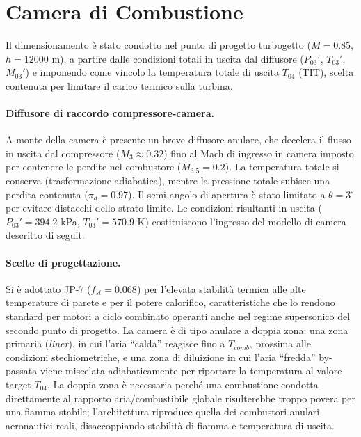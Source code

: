 \section{Camera di Combustione}
\label{sec:camera}

Il dimensionamento è stato condotto nel punto di progetto turbogetto ($M=0.85$, $h=12000$ m), a partire dalle condizioni totali in uscita dal diffusore ($P_{03}'$, $T_{03}'$, $M_{03}'$) e imponendo come vincolo la temperatura totale di uscita $T_{04}$ (TIT), scelta contenuta per limitare il carico termico sulla turbina.

\paragraph{Diffusore di raccordo compressore-camera.}
A monte della camera è presente un breve diffusore anulare, che decelera il flusso in uscita dal compressore ($M_3\approx0.32$) fino al Mach di ingresso in camera imposto per contenere le perdite nel combustore ($M_{3.5}=0.2$). La temperatura totale si conserva (trasformazione adiabatica), mentre la pressione totale subisce una perdita contenuta ($\pi_d=0.97$). Il semi-angolo di apertura è stato limitato a $\theta=3^\circ$ per evitare distacchi dello strato limite. Le condizioni risultanti in uscita ($P_{03}'=394.2$ kPa, $T_{03}'=570.9$ K) costituiscono l'ingresso del modello di camera descritto di seguit.

\paragraph{Scelte di progettazione.}
Si è adottato JP-7 ($f_{st}=0.068$) per l'elevata stabilità termica alle alte temperature di parete e per il potere calorifico, caratteristiche che lo rendono standard per motori a ciclo combinato operanti anche nel regime supersonico del secondo punto di progetto. La camera è di tipo anulare a doppia zona: una zona primaria (\textit{liner}), in cui l'aria ``calda'' reagisce fino a $T_{comb}$, prossima alle condizioni stechiometriche, e una zona di diluizione in cui l'aria ``fredda'' by-passata viene miscelata adiabaticamente per riportare la temperatura al valore target $T_{04}$. La doppia zona è necessaria perché una combustione condotta direttamente al rapporto aria/combustibile globale risulterebbe troppo povera per una fiamma stabile; l'architettura riproduce quella dei combustori anulari aeronautici reali, disaccoppiando stabilità di fiamma e temperatura di uscita.

